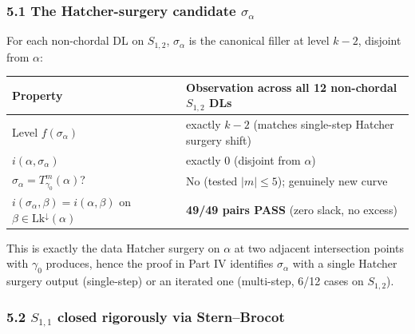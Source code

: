 \documentclass[
]{article}
\newcounter{none} %
\begin{document}
\subsubsection{\texorpdfstring{5.1 The Hatcher-surgery candidate
\(\sigma_\alpha\)}{5.1 The Hatcher-surgery candidate \textbackslash sigma\_\textbackslash alpha}}\label{the-hatcher-surgery-candidate-sigma_alpha}

For each non-chordal DL on \(S_{1,2}\), \(\sigma_\alpha\) is the
canonical filler at level \(k - 2\), disjoint from \(\alpha\):

{\def\LTcaptype{none} %
\begin{longtable}[]{@{}
  >{\raggedright\arraybackslash}p{}
  >{\raggedright\arraybackslash}p{}@{}}
\toprule\noalign{}
\begin{minipage}[b]{\linewidth}\raggedright
Property
\end{minipage} & \begin{minipage}[b]{\linewidth}\raggedright
Observation across all 12 non-chordal \(S_{1,2}\) DLs
\end{minipage} \\
\midrule\noalign{}
\endhead
\bottomrule\noalign{}
\endlastfoot
Level \(f(\sigma_\alpha)\) & exactly \(k - 2\) (matches single-step
Hatcher surgery shift) \\
\(i(\alpha, \sigma_\alpha)\) & exactly \(0\) (disjoint from
\(\alpha\)) \\
\(\sigma_\alpha = T_{\gamma_0}^m(\alpha)\)? & No (tested \(|m| \le 5\));
genuinely new curve \\
\(i(\sigma_\alpha, \beta) = i(\alpha, \beta)\) on
\(\beta \in \mathrm{Lk}^\downarrow(\alpha)\) & \textbf{49/49 pairs PASS}
(zero slack, no excess) \\
\end{longtable}
}

This is exactly the data Hatcher surgery on \(\alpha\) at two adjacent
intersection points with \(\gamma_0\) produces, hence the proof in Part
IV identifies \(\sigma_\alpha\) with a single Hatcher surgery output
(single-step) or an iterated one (multi-step, 6/12 cases on
\(S_{1,2}\)).

\subsubsection{\texorpdfstring{5.2 \(S_{1,1}\) closed rigorously via
Stern--Brocot}{5.2 S\_\{1,1\} closed rigorously via Stern--Brocot}}\label{s_11-closed-rigorously-via-sternbrocot}
\end{document}
